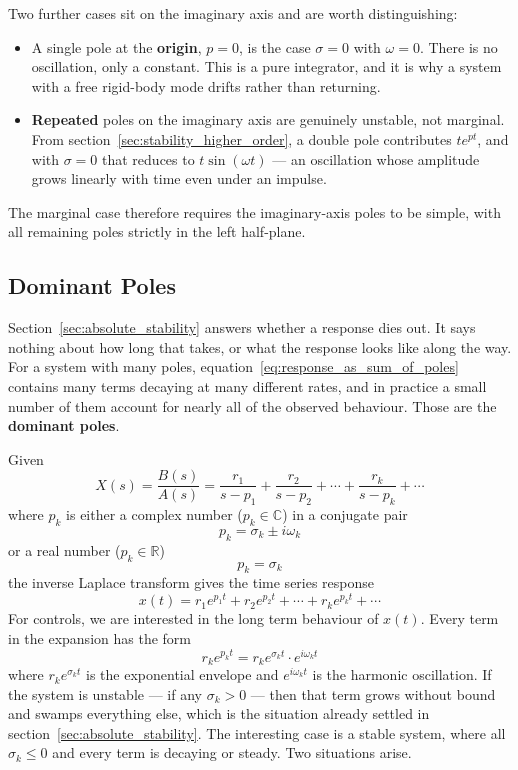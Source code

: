 \documentclass[12pt,letter]{article}
\begin{document}
Two further cases sit on the imaginary axis and are worth distinguishing:
\begin{itemize}
	\item A single pole at the \textbf{origin}, $p = 0$, is the case $\sigma = 0$ with $\omega = 0$. There is no oscillation, only a constant. This is a pure integrator, and it is why a system with a free rigid-body mode drifts rather than returning.
	\item \textbf{Repeated} poles on the imaginary axis are genuinely unstable, not marginal. From section~\ref{sec:stability_higher_order}, a double pole contributes $te^{pt}$, and with $\sigma = 0$ that reduces to $t\sin(\omega t)$ --- an oscillation whose amplitude grows linearly with time even under an impulse.
\end{itemize}

\noindent The marginal case therefore requires the imaginary-axis poles to be simple, with all remaining poles strictly in the left half-plane.


\subsection{Dominant Poles}
\label{sec:dominant_poles}

Section~\ref{sec:absolute_stability} answers whether a response dies out. It says nothing about how long that takes, or what the response looks like along the way. For a system with many poles, equation~\ref{eq:response_as_sum_of_poles} contains many terms decaying at many different rates, and in practice a small number of them account for nearly all of the observed behaviour. Those are the \textbf{dominant poles}.

Given
\begin{equation}
	X(s) = \frac{B(s)}{A(s)} = \frac{r_1}{s-p_1} + \frac{r_2}{s-p_2} + \cdots + \frac{r_k}{s-p_k} + \cdots
\end{equation}
where $p_k$ is either a complex number ($p_k \in \mathbb{C}$) in a conjugate pair
\begin{equation}
	p_k = \sigma_k \pm i \omega_k
\end{equation}
or a real number ($p_k \in \mathbb{R}$)
\begin{equation}
	p_k = \sigma_k
\end{equation}
the inverse Laplace transform gives the time series response
\begin{equation}
	x(t) = r_1 e^{p_1 t} + r_2 e^{p_2 t} + \cdots + r_k e^{p_k t} + \cdots
\end{equation}
For controls, we are interested in the long term behaviour of $x(t)$. Every term in the expansion has the form
\begin{equation}
	r_k e^{p_k t} = r_k e^{\sigma_k t} \cdot e^{i \omega_k t}
\end{equation}
where $r_k e^{\sigma_k t}$ is the exponential envelope and $e^{i \omega_k t}$ is the harmonic oscillation. If the system is unstable --- if any $\sigma_k > 0$ --- then that term grows without bound and swamps everything else, which is the situation already settled in section~\ref{sec:absolute_stability}. The interesting case is a stable system, where all $\sigma_k \leq 0$ and every term is decaying or steady. Two situations arise.
\end{document}
